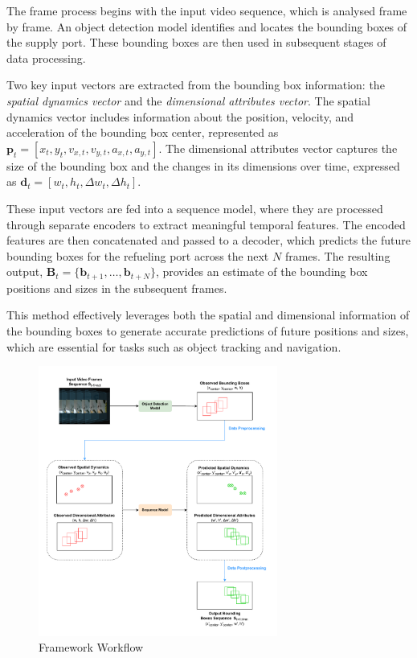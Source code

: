 \documentclass[12pt,oneside]{book} %
\begin{document}
The frame process begins with the input video sequence, which is analysed frame
by frame. An object detection model identifies and locates the bounding boxes
of the supply port. These bounding boxes are then used in subsequent stages of
data processing.

Two key input vectors are extracted from the bounding box information: the
\textit{spatial dynamics vector} and the \textit{dimensional attributes
    vector}. The spatial dynamics vector includes information about the position,
velocity, and acceleration of the bounding box center, represented as
\(\mathbf{p}_t = [x_t, y_t, v_{x,t}, v_{y,t}, a_{x,t}, a_{y,t}]\). The
dimensional attributes vector captures the size of the bounding box and the
changes in its dimensions over time, expressed as \(\mathbf{d}_t = [w_t, h_t,
\Delta w_t, \Delta h_t]\).

These input vectors are fed into a sequence model, where they are processed
through separate encoders to extract meaningful temporal features. The encoded
features are then concatenated and passed to a decoder, which predicts the
future bounding boxes for the refueling port across the next \(N\) frames. The
resulting output, \(\mathbf{B}_{t} = \{\mathbf{b}_{t+1}, \dots,
\mathbf{b}_{t+N}\}\), provides an estimate of the bounding box positions and
sizes in the subsequent frames.

This method effectively leverages both the spatial and dimensional information
of the bounding boxes to generate accurate predictions of future positions and
sizes, which are essential for tasks such as object tracking and navigation.

\begin{figure}[H]
    \centering
    \includegraphics[width=0.7\textwidth]{figures/FrameworkWorkflow.drawio.pdf}
    \caption{Framework Workflow}\label{fig:framework-workflow}
\end{figure}
\end{document}
